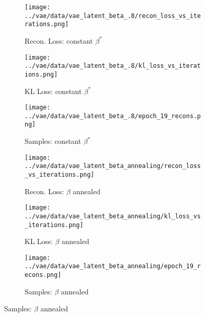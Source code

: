 \documentclass[11pt,addpoints,answers]{exam}
\numberwithin{equation}{section} %
\numberwithin{figure}{section} %
\numberwithin{table}{section} %
\begin{document}
\begin{questions}
\begin{solution}
\begin{figure}[H]
    \begin{subfigure}[b]{0.32\linewidth}
    \texttt{[image: ../vae/data/vae\_latent\_beta\_.8/recon\_loss\_vs\_iterations.png]}
    \caption{Recon. Loss: constant $\beta^*$}
    \end{subfigure}
    \begin{subfigure}[b]{0.32\linewidth}
    \texttt{[image: ../vae/data/vae\_latent\_beta\_.8/kl\_loss\_vs\_iterations.png]}
    \caption{KL Loss: constant $\beta^*$}
    \end{subfigure}
    \begin{subfigure}[b]{0.32\linewidth}
    \texttt{[image: ../vae/data/vae\_latent\_beta\_.8/epoch\_19\_recons.png]}
    \caption{Samples: constant $\beta^*$}
    \end{subfigure}
    
    \begin{subfigure}[b]{0.32\linewidth}
    \texttt{[image: ../vae/data/vae\_latent\_beta\_annealing/recon\_loss\_vs\_iterations.png]}
    \caption{Recon. Loss: $\beta$ annealed}
    \end{subfigure}
    \begin{subfigure}[b]{0.32\linewidth}
    \texttt{[image: ../vae/data/vae\_latent\_beta\_annealing/kl\_loss\_vs\_iterations.png]}
    \caption{KL Loss: $\beta$ annealed}
    \end{subfigure}
    \begin{subfigure}[b]{0.32\linewidth}
    \texttt{[image: ../vae/data/vae\_latent\_beta\_annealing/epoch\_19\_recons.png]}
    \caption{Samples: $\beta$ annealed}
    \end{subfigure}
\end{figure}
\end{solution}
\end{questions}
\newpage
\end{document}

